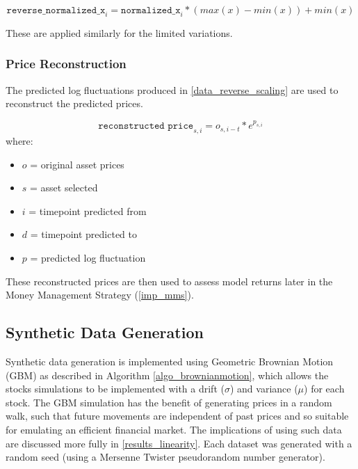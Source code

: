 \documentclass[a4paper,11pt,oneside]{article}
\theoremstyle{plain}
\theoremstyle{definition}
\begin{document}
\begin{equation}
\texttt{reverse\_normalized\_x}_i = \texttt{normalized\_x}_i * (max(x) - min(x)) + min(x)
\end{equation}

These are applied similarly for the limited variations.

\subsubsection{Price Reconstruction}\label{data_price_recon}

The predicted log fluctuations produced in \ref{data_reverse_scaling} are used to reconstruct the predicted prices. 

\begin{equation}
\texttt{reconstructed price}_{s,i} = o_{s,i-t} * e^{p_{s,i}}
\end{equation}
where:
\begin{itemize}
	\item [] $o$ = original asset prices
	\item [] $s$ = asset selected
	\item [] $i$ = timepoint predicted from
	\item [] $d$ = timepoint predicted to
	\item [] $p$ = predicted log fluctuation 
 
\end{itemize}
\texttt{}\newline
These reconstructed prices are then used to assess model returns later in the Money Management Strategy (\ref{imp_mms}).

\subsection{Synthetic Data Generation}\label{data_synthetic}

Synthetic data generation is implemented using Geometric Brownian Motion (GBM) as described in Algorithm \ref{algo_brownianmotion}, which allows the stocks simulations to be implemented with a drift ($\sigma$) and variance ($\mu$) for each stock. The GBM simulation has the benefit of generating prices in a random walk, such that future movements are independent of past prices and so suitable for emulating an efficient financial market. The implications of using such data are discussed more fully in \ref{results_linearity}. Each dataset was generated with a random seed (using a Mersenne Twister pseudorandom number generator). \newline
\end{document}

